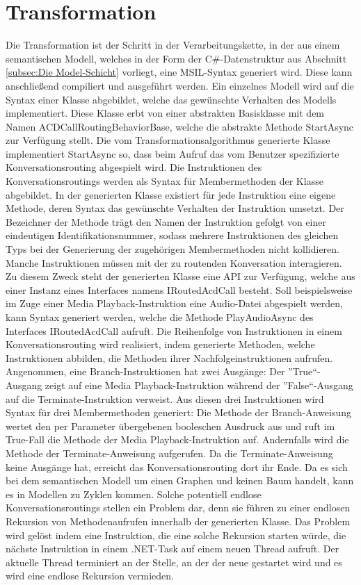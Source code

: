 \section{Transformation}
\label{sec:Transformation}
Die Transformation ist der Schritt in der Verarbeitungskette, in der aus einem semantischen Modell, welches in der Form der C\#-Datenstruktur aus Abschnitt \ref{subsec:Die Model-Schicht} vorliegt, eine MSIL-Syntax generiert wird. Diese kann anschließend compiliert und ausgeführt werden. Ein einzelnes Modell wird auf die Syntax einer Klasse abgebildet, welche das gewünschte Verhalten des Modells implementiert. Diese Klasse erbt von einer abstrakten Basisklasse mit dem Namen ACDCallRoutingBehaviorBase, welche die abstrakte Methode StartAsync zur Verfügung stellt. Die vom Transformationsalgorithmus generierte Klasse implementiert StartAsync so, dass beim Aufruf das vom Benutzer spezifizierte Konversationsrouting abgespielt wird.
\newline 
Die Instruktionen des Konversationsroutings werden als Syntax für Membermethoden der Klasse abgebildet. In der generierten Klasse existiert für jede Instruktion eine eigene Methode, deren Syntax das gewünschte Verhalten der Instruktion umsetzt. Der Bezeichner der Methode trägt den Namen der Instruktion gefolgt von einer eindeutigen Identifikationsnummer, sodass mehrere Instruktionen des gleichen Typs bei der Generierung der zugehörigen Membermethoden nicht kollidieren. Manche Instruktionen müssen mit der zu routenden Konversation interagieren. Zu diesem Zweck steht der generierten Klasse eine API zur Verfügung, welche aus einer Instanz eines Interfaces namens IRoutedAcdCall besteht. Soll beispielsweise im Zuge einer Media Playback-Instruktion eine Audio-Datei abgespielt werden, kann Syntax generiert werden, welche die Methode PlayAudioAsync des Interfaces IRoutedAcdCall aufruft. 
\newline
Die Reihenfolge von Instruktionen in einem Konversationsrouting wird realisiert, indem generierte Methoden, welche Instruktionen abbilden, die Methoden ihrer Nachfolgeinstruktionen aufrufen. Angenommen, eine Branch-Instruktionen hat zwei Ausgänge: Der ''True``-Ausgang zeigt auf eine Media Playback-Instruktion während der ''False``-Ausgang auf die Terminate-Instruktion verweist. Aus diesen drei Instruktionen wird Syntax für drei Membermethoden generiert: Die Methode der Branch-Anweisung wertet den per Parameter übergebenen booleschen Ausdruck aus und ruft im True-Fall die Methode der Media Playback-Instruktion auf. Andernfalls wird die Methode der Terminate-Anweisung aufgerufen. Da die Terminate-Anweisung keine Ausgänge hat, erreicht das Konversationsrouting dort ihr Ende. Da es sich bei dem semantischen Modell um einen Graphen und keinen Baum handelt, kann es in Modellen zu Zyklen kommen. Solche potentiell endlose Konversationsroutings stellen ein Problem dar, denn sie führen zu einer endlosen Rekursion von Methodenaufrufen innerhalb der generierten Klasse. Das Problem wird gelöst indem eine Instruktion, die eine solche Rekursion starten würde, die nächste Instruktion in einem .NET-Task auf einem neuen Thread aufruft. Der aktuelle  Thread terminiert an der Stelle, an der der neue gestartet wird und es wird eine endlose Rekursion vermieden.
